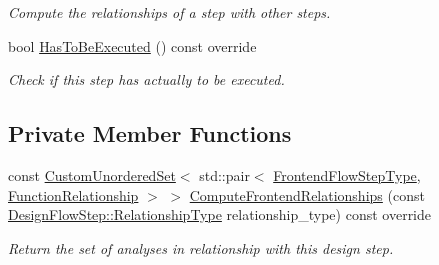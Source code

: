 \begin{DoxyCompactItemize}
\begin{DoxyCompactList}\small\item\em Compute the relationships of a step with other steps. \end{DoxyCompactList}\item 
bool \hyperlink{classlut__transformation_a41cd40761d625f5f747b78b51d545c95}{Has\+To\+Be\+Executed} () const override
\begin{DoxyCompactList}\small\item\em Check if this step has actually to be executed. \end{DoxyCompactList}\end{DoxyCompactItemize}
\subsection*{Private Member Functions}
\begin{DoxyCompactItemize}
\item 
const \hyperlink{classCustomUnorderedSet}{Custom\+Unordered\+Set}$<$ std\+::pair$<$ \hyperlink{frontend__flow__step_8hpp_afeb3716c693d2b2e4ed3e6d04c3b63bb}{Frontend\+Flow\+Step\+Type}, \hyperlink{classFrontendFlowStep_af7cf30f2023e5b99e637dc2058289ab0}{Function\+Relationship} $>$ $>$ \hyperlink{classlut__transformation_af8ac14b6eaae00e154894fea4626252b}{Compute\+Frontend\+Relationships} (const \hyperlink{classDesignFlowStep_a723a3baf19ff2ceb77bc13e099d0b1b7}{Design\+Flow\+Step\+::\+Relationship\+Type} relationship\+\_\+type) const override
\begin{DoxyCompactList}\small\item\em Return the set of analyses in relationship with this design step. \end{DoxyCompactList}\end{DoxyCompactItemize}
